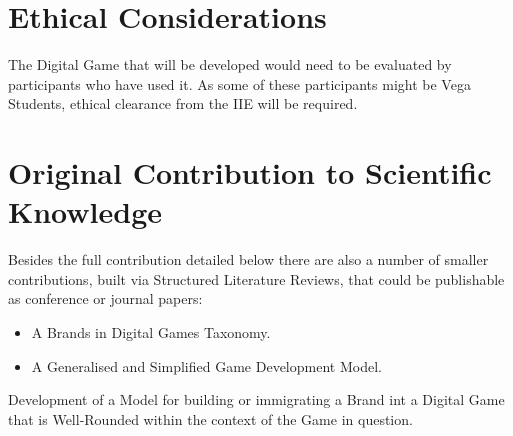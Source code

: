 \documentclass{article}
\begin{document}
\section{Ethical Considerations}

The Digital Game that will be developed would need to be evaluated by participants who have used it. As some of these participants might be Vega Students, ethical clearance from the IIE will be required.

\section{Original Contribution to Scientific Knowledge}

Besides the full contribution detailed below there are also a number of smaller contributions, built via Structured Literature Reviews, that could be publishable as conference or journal papers:
\begin{itemize}
    \item A Brands in Digital Games Taxonomy.
    \item A Generalised and Simplified Game Development Model.
\end{itemize}

Development of a Model for building or immigrating a Brand int a Digital Game that is Well-Rounded within the context of the Game in question.




\end{document}
